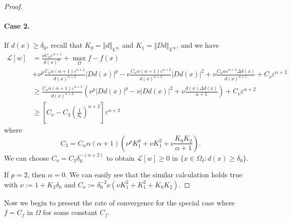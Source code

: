 \documentclass[12pt,reqno]{amsart}
\numberwithin{figure}{section}
\theoremstyle{plain}
\theoremstyle{remark}
\numberwithin{equation}{section}
\begin{document}
\begin{proof}
\paragraph{\textbf{Case 2.}} If $d(x)\geq \delta_0$, recall that $K_0 = \Vert d\Vert_{L^\infty}$ and $K_1 = \Vert D d\Vert_{L^\infty}$, and we have
\begin{align*}
    \mathcal{L}[w] &= \frac{\nu C_\alpha \varepsilon^{\alpha+1}}{d(x)^\alpha} + \max_{\Omega} f - f(x)\\
    &+  \nu^p\frac{C_\alpha\alpha(\alpha+1)\varepsilon^{\alpha+2}}{d(x)^{\alpha+2}}|D d(x)|^p - \nu \frac{C_\alpha \alpha(\alpha+1)\varepsilon^{\alpha+2}}{d(x)^{\alpha+2}}|D d(x)|^2 
    + \nu \frac{C_\alpha \alpha \varepsilon^{\alpha+2}\Delta d(x)}{d(x)^{\alpha+1}} + C_\nu \varepsilon^{\alpha+2}\\
    &\geq \frac{C_\alpha \alpha(\alpha+1)\varepsilon^{\alpha+2}}{d(x)^{\alpha+2}}\left(\nu^p|D d(x)|^p - \nu |D d(x)|^2 + \nu \frac{d(x) \Delta d(x)}{\alpha+1}\right) + C_\nu \varepsilon^{\alpha+2}\\
    &\geq \left[C_\nu - C_3\left(\frac{1}{\delta_0}\right)^{\alpha+2}\right]\varepsilon^{\alpha+2}
\end{align*}
where 
\begin{equation*}
    C_3 = C_\alpha\alpha(\alpha+1) \left(\nu^pK_1^p + \nu K_1^2 + \nu \frac{K_0K_2}{\alpha+1}\right).
\end{equation*}
We can choose $C_\nu = C_3\delta_0^{-(\alpha+2)}$ to obtain $\mathcal{L}[w]\geq 0$ in $\{x\in \Omega_\delta:d(x)\geq \delta_0\}$. 
\smallskip

\noindent
If $p=2$, then $\alpha = 0$. We can easily see that the similar calculation holds true with $\nu := 1+K_2\delta_0$ and $C_\nu := \delta_0^{-2}\nu (\nu K_1^2 + K_1^2+ K_0K_2)$.
\end{proof}

Now we begin to present the rate of convergence for the special case where $f = C_f$ in $\Omega$ for some constant $C_f$. 
\end{document}
